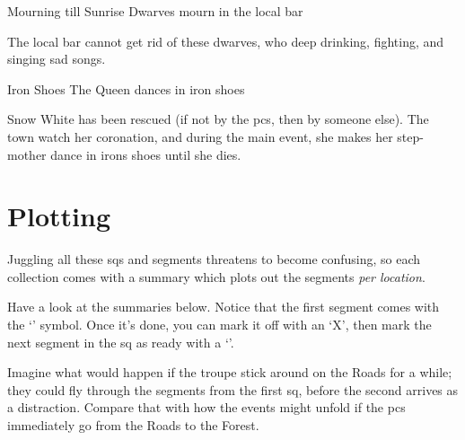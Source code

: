 \begin{multicols}{2}
{Mourning till Sunrise}%
{Dwarves mourn in the local bar}%

The local bar cannot get rid of these dwarves, who deep drinking, fighting, and singing sad songs. 

{Iron Shoes}%
{The Queen dances in iron shoes}%

Snow White has been rescued (if not by the \glspl{pc}, then by someone else).
The town watch her coronation, and during the main event, she makes her step-mother dance in irons shoes until she dies.

\end{multicols}

\section{Plotting }

\begin{multicols}{2}

\noindent
Juggling all these \glspl{sq} and \glspl{segment} threatens to become confusing, so each collection comes with a summary which plots out the \glspl{segment} \emph{per location}.

Have a look at the summaries below.
Notice that the first \gls{segment} comes with the `\sqr' symbol.
Once it's done, you can mark it off with an `X', then mark the next \gls{segment} in the \gls{sq} as ready with a `\sqr'.

Imagine what would happen if the troupe stick around on the Roads for a while; they could fly through the \glspl{segment} from the first \gls{sq}, before the second arrives as a distraction.
Compare that with how the events might unfold if the \glspl{pc} immediately go from the Roads to the Forest.

\end{multicols}


\bigLine

